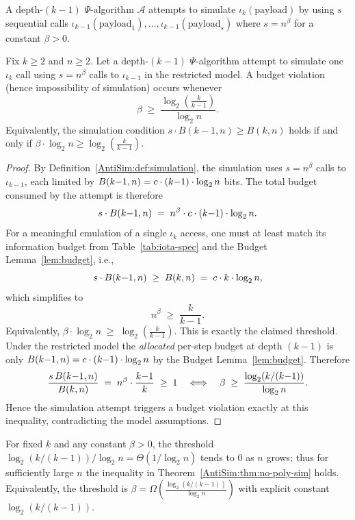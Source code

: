 \begin{definition}
\label{AntiSim:def:simulation}
A depth-\((k{-}1)\) $\Psi$-algorithm $\mathcal{A}$ attempts to simulate $\iota_k(\text{payload})$ by using $s$ sequential calls $\iota_{k-1}(\text{payload}_1),\ldots,\iota_{k-1}(\text{payload}_s)$ where $s = n^\beta$ for a constant $\beta > 0$.
\end{definition}

\begin{theorem}
\label{AntiSim:thm:no-poly-sim}
Fix $k \geq 2$ and $n \geq 2$. Let a depth-\((k{-}1)\) $\Psi$-algorithm attempt to simulate one $\iota_k$ call using $s = n^\beta$ calls to $\iota_{k-1}$ in the restricted model. A budget violation (hence impossibility of simulation) occurs whenever
\[
  \beta \;\geq\; \frac{\log_{2}\!\left(\tfrac{k}{k-1}\right)}{\log_{2} n}.
\]
Equivalently, the simulation condition $s\cdot B(k{-}1,n) \geq B(k,n)$ holds if and only if $\beta \cdot \log_{2} n \geq \log_{2}\!\left(\tfrac{k}{k-1}\right)$.
\end{theorem}

\begin{proof}
By Definition~\ref{AntiSim:def:simulation}, the simulation uses $s = n^\beta$ calls to $\iota_{k-1}$, each limited by $\B(k{-}1,n)=c \cdot (k{-}1) \cdot \log_{2} n$ bits. The total budget consumed by the attempt is therefore
\[
  s\cdot \B(k{-}1,n) \;=\; n^\beta \cdot c \cdot (k{-}1) \cdot \log_{2} n.
\]
For a meaningful emulation of a single $\iota_k$ access, one must at least match its information budget from Table~\ref{tab:iota-spec} and the Budget Lemma~\ref{lem:budget}, i.e.,
\[
  s\cdot \B(k{-}1,n) 
  \;\geq\; \B(k,n)
  \;=\; c \cdot k \cdot \log_{2} n,
\]
which simplifies to
\[
  n^\beta \;\geq\; \frac{k}{k{-}1}.
\]
Equivalently, $\beta \cdot \log_{2} n 
\;\geq\; \log_{2}\!\left(\tfrac{k}{k-1}\right)$. This is exactly the claimed threshold. Under the restricted model the 
\emph{allocated} per-step budget at depth $(k{-}1)$ is only $\B(k{-}1,n)=c \cdot (k{-}1) \cdot \log_{2} n$ by the Budget Lemma~\ref{lem:budget}. Therefore
\[
\frac{s\,\B(k{-}1,n)}{\B(k,n)} 
\;=\; n^{\beta} \cdot \frac{k{-}1}{k}
\;\geq\; 1
\quad \Longleftrightarrow \quad 
\beta \;\geq\; \frac{\log_{2}(k/(k{-}1))}{\log_{2} n}.
\]
Hence the simulation attempt triggers a budget violation exactly at this inequality, contradicting the model assumptions.
\end{proof}

\begin{remark}
For fixed $k$ and any constant $\beta>0$, the threshold $\log_{2}(k/(k{-}1))/\log_{2} n = \Theta(1/\log_{2} n)$ tends to $0$ as $n$ grows; thus for sufficiently large $n$ the inequality in Theorem~\ref{AntiSim:thm:no-poly-sim} holds. Equivalently, the threshold is $\beta = \Omega\!\left(\tfrac{\log_{2}(k/(k{-}1))}{\log_{2} n}\right)$ with explicit constant $\log_{2}(k/(k{-}1))$.
\end{remark}

